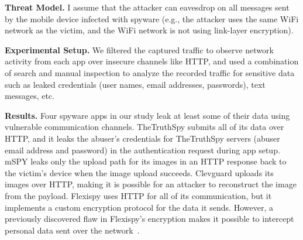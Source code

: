 \textbf{Threat Model.} I assume that the attacker can eavesdrop on
all messages sent by the mobile device infected with spyware (e.g.,
the attacker uses the same WiFi network as the victim, and the WiFi
network is not using link-layer encryption).



\textbf{Experimental Setup.}
We filtered the captured traffic to observe network activity from each app over
insecure channels like HTTP, and used a combination of search and
manual inspection to analyze the recorded traffic for sensitive data
such as leaked credentials (user names, email addresses, passwords),
text messages,
etc.



\textbf{Results.}  Four spyware apps in our study leak at least some
of their data using vulnerable communication channels.  TheTruthSpy
submits all of its data over HTTP, and it leaks the abuser's
credentials for TheTruthSpy servers (abuser email address and
password) in the authentication request during app setup.
mSPY leaks only
the upload path for its images in an HTTP response back to the
victim's device when the image upload succeeds.
Clevguard uploads its images over HTTP, making it is possible for an attacker to reconstruct the image from the payload.  Flexispy uses
HTTP for all of its communication, but it implements a custom
encryption protocol for the data it sends.  However, a previously
discovered flaw in Flexispy's encryption makes it possible to
intercept personal data sent over the
network~\cite{Stalking85:online}.

